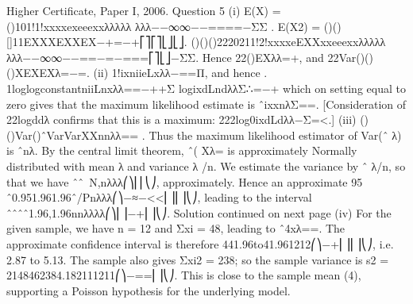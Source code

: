 Higher Certificate, Paper I, 2006. Question 5
(i) E(X) = ()101!1!xxxxexeeexxλλλλλ λλλ−−∞∞−−====−ΣΣ .
E(X2) = ()()[]11EXXXEXXEX−+=−+⎡⎤⎡⎤⎣⎦⎣⎦.
()()()2220211!2!xxxxeEXXxxeeexxλλλλλ λλλ−−∞∞−−==−=−===⎡⎤⎣⎦−ΣΣ.
Hence 22()EXλλ=+, and {}22Var()()()XEXEXλ=−=.
(ii) 1!ixniieLxλλ−==Π, and hence . 1loglogconstantniiLnxλλ==−++Σ
logixdLndλλΣ∴=−+ which on setting equal to zero gives that the maximum likelihood estimate is ˆixxnλΣ==. [Consideration of 22logddλ confirms that this is a maximum: 222log0ixdLdλλ−Σ=<.]
(iii) ()()Var()ˆVarVarXXnnλλ== .
Thus the maximum likelihood estimator of Var(ˆ
λ) is ˆnλ.
By the central limit theorem, ˆ( Xλ= is approximately Normally distributed with mean λ and variance λ /n. We estimate the variance by ˆ
λ/n, so that we have ˆˆ~N,nλλλ⎛⎞⎜⎜⎝⎠, approximately.
Hence an approximate 95%
ˆ0.951.961.96ˆ/Pnλλλ⎛⎞−≈−<<⎜⎟⎜⎟⎝⎠,
leading to the interval ˆˆˆˆ1.96,1.96nnλλλλ⎛⎞⎜⎟−+⎜⎟⎝⎠.
Solution continued on next page
(iv) For the given sample, we have n = 12 and Σxi = 48, leading to ˆ4xλ==. The approximate confidence interval is therefore
441.96to41.961212⎛⎞−+⎜⎟⎜⎟⎝⎠, i.e. 2.87 to 5.13.
The sample also gives Σxi2 = 238; so the sample variance is
s2 = 2148462384.182111211⎛⎞−==⎜⎟⎝⎠.
This is close to the sample mean (4), supporting a Poisson hypothesis for the underlying model.
